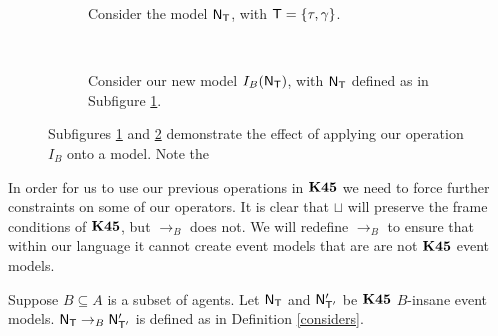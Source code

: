 \begin{figure}[ht!]
\centering
\begin{subfigure}[b]{.45\textwidth}
\centering
{}
\caption{Consider the model $\mathrm{\mathsf{N}}_\mathrm{\mathsf{T}}$, with $\mathrm{\mathsf{T}} = \{\tau, \gamma\}$.}
\label{beforeOperation}
\end{subfigure}
~
\begin{subfigure}[b]{.45\textwidth}
\centering
{}
\caption{Consider our new model $I_B(\mathrm{\mathsf{N}}_\mathrm{\mathsf{T}})$, with $\mathrm{\mathsf{N}}_\mathrm{\mathsf{T}}$ defined as in Subfigure
\ref{beforeOperation}.}
\label{afterOperation}
\end{subfigure}
\caption{Subfigures \ref{beforeOperation} and \ref{afterOperation} demonstrate the effect of
applying our operation $I_B$ onto a model.
Note the }
\label{k45VsKModels}
\end{figure}

In order for us to use our previous operations in $\bf K45$ we need to force further constraints on
some of our operators.
It is clear that $\sqcup$ will preserve the frame conditions of $\bf K45$, but $\to_B$ does not.
We will redefine $\to_B$ to ensure that within our language it cannot create event models that are
are not $\bf K45$ event models.

\begin{defn} \label{defn:k45:considers}
	Suppose $B \subseteq A$ is a subset of agents.
	Let $\mathrm{\mathsf{N}}_\mathrm{\mathsf{T}}$ and $\mathrm{\mathsf{N}}'_{\mathrm{\mathsf{T}}'}$ be $\bf K45$ $B$-insane event models.
	$\mathrm{\mathsf{N}}_\mathrm{\mathsf{T}} \to_B \mathrm{\mathsf{N}}'_{\mathrm{\mathsf{T}}'}$ is defined as in Definition \ref{considers}.
\end{defn}

